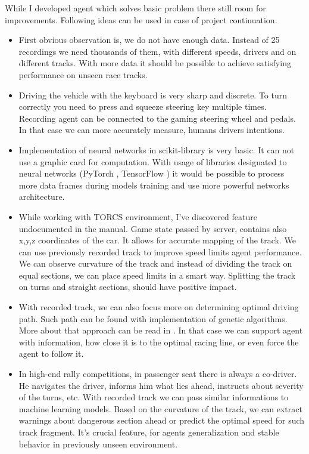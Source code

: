 \documentclass[declaration,shortabstract,english,inz]{iithesis}
\begin{document}
While I developed agent which solves basic problem there still room for improvements.
Following ideas can be used in case of project continuation.
\begin{itemize}
    \item First obvious observation is, we do not have enough data.
Instead of 25 recordings we need thousands of them, with different speeds, drivers and on different tracks.
With more data it should be possible to achieve satisfying performance on unseen race tracks.

    \item Driving the vehicle with the keyboard is very sharp and discrete.
To turn correctly you need to press and squeeze steering key multiple times.
Recording agent can be connected to the gaming steering wheel and pedals.
In that case we can more accurately measure, humans drivers intentions.

    \item Implementation of neural networks in scikit-library is very basic.
It can not use a graphic card for computation.
With usage of libraries designated to neural networks (PyTorch \cite{py_torch}, TensorFlow \cite{tensor_flow}) it would be possible to process more data frames during models training and use more  powerful networks architecture.

    \item While working with TORCS environment, I've discovered feature undocumented in the manual.
    Game state passed by server, contains also x,y,z coordinates of the car.
    It allows for accurate mapping of the track.
    We can use previously recorded track to improve speed limits agent performance.
    We can observe curvature of the track and instead of dividing the track on equal sections, we can place speed limits in a smart way.
    Splitting the track on turns and straight sections, should have positive impact.

    \item With recorded track, we can also focus more on determining optimal driving path.
    Such path can be found with implementation of genetic algorithms. More about that approach can be read in \cite{genetic-optimal-race-line}.
    In that case we can support agent with information, how close it is to the optimal racing line, or even force the agent to follow it.
    
    \item In high-end rally competitions, in passenger seat there is always a co-driver.
    He navigates the driver, informs him what lies ahead, instructs about severity of the turns, etc.
    With recorded track we can pass similar informations to machine learning models. Based on the curvature of the track, we can extract warnings about dangerous section ahead or predict the optimal speed for such track fragment.
    It's crucial feature, for agents generalization and stable behavior in previously unseen environment.


\end{itemize}
\end{document}
